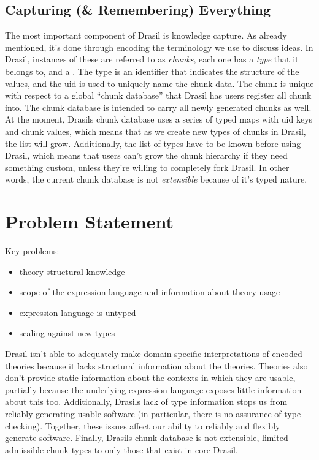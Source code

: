 \subsection{Capturing (\& Remembering) Everything}

The most important component of Drasil is knowledge capture. As already
mentioned, it's done through encoding the terminology we use to discuss ideas.
In Drasil, instances of these are referred to as \textit{chunks}, each one has a
\textit{type} that it belongs to, and a . The type is an identifier
that indicates the structure of the values, and the \acs{uid} is used to
uniquely name the chunk data. The chunk is unique with respect to a global
``chunk database'' that Drasil has users register all chunk into. The chunk
database is intended to carry all newly generated chunks as well. At the moment,
Drasils chunk database uses a series of typed maps with \acs{uid} keys and chunk
values, which means that as we create new types of chunks in Drasil, the list
will grow. Additionally, the list of types have to be known before using Drasil,
which means that users can't grow the chunk hierarchy if they need something
custom, unless they're willing to completely fork Drasil. In other words, the
current chunk database is not \textit{extensible} because of it's typed nature.

\section{Problem Statement}
\label{sec:intro:problemStatement}

\begin{writingdirectives}
      \item Key problems:
      \begin{itemize}
            \item theory structural knowledge
            \item scope of the expression language and information about theory usage
            \item expression language is untyped
            \item scaling against new types
      \end{itemize}
\end{writingdirectives}

Drasil isn't able to adequately make domain-specific interpretations of encoded
theories because it lacks structural information about the theories. Theories
also don't provide static information about the contexts in which they are
usable, partially because the underlying expression language exposes little
information about this too. Additionally, Drasils lack of type information stops
us from reliably generating usable software (in particular, there is no
assurance of type checking). Together, these issues affect our ability to
reliably and flexibly generate software. Finally, Drasils chunk database is not
extensible, limited admissible chunk types to only those that exist in core
Drasil.

